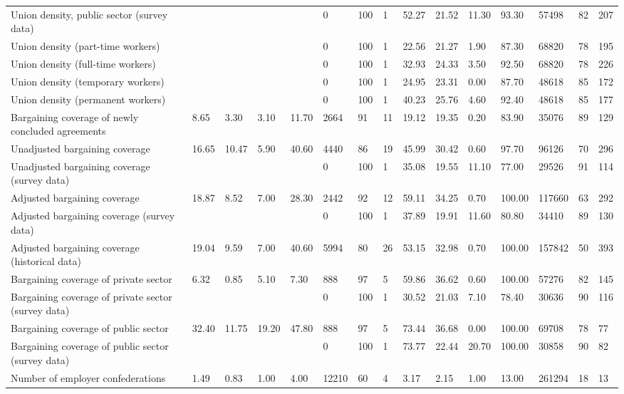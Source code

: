 \begin{longtable}{lllllllllllllll}
Union density, public sector (survey data) &  &  &  &  & 0 & 100 & 1 & 52.27 & 21.52 & 11.30 & 93.30 & 57498 & 82 & 207\\
Union density (part-time workers) &  &  &  &  & 0 & 100 & 1 & 22.56 & 21.27 & 1.90 & 87.30 & 68820 & 78 & 195\\
Union density (full-time workers) &  &  &  &  & 0 & 100 & 1 & 32.93 & 24.33 & 3.50 & 92.50 & 68820 & 78 & 226\\
Union density (temporary workers) &  &  &  &  & 0 & 100 & 1 & 24.95 & 23.31 & 0.00 & 87.70 & 48618 & 85 & 172\\
\addlinespace
Union density (permanent workers) &  &  &  &  & 0 & 100 & 1 & 40.23 & 25.76 & 4.60 & 92.40 & 48618 & 85 & 177\\
Bargaining coverage of newly concluded agreements & 8.65 & 3.30 & 3.10 & 11.70 & 2664 & 91 & 11 & 19.12 & 19.35 & 0.20 & 83.90 & 35076 & 89 & 129\\
Unadjusted bargaining coverage & 16.65 & 10.47 & 5.90 & 40.60 & 4440 & 86 & 19 & 45.99 & 30.42 & 0.60 & 97.70 & 96126 & 70 & 296\\
Unadjusted bargaining coverage (survey data) &  &  &  &  & 0 & 100 & 1 & 35.08 & 19.55 & 11.10 & 77.00 & 29526 & 91 & 114\\
Adjusted bargaining coverage & 18.87 & 8.52 & 7.00 & 28.30 & 2442 & 92 & 12 & 59.11 & 34.25 & 0.70 & 100.00 & 117660 & 63 & 292\\
\addlinespace
Adjusted bargaining coverage (survey data) &  &  &  &  & 0 & 100 & 1 & 37.89 & 19.91 & 11.60 & 80.80 & 34410 & 89 & 130\\
Adjusted bargaining coverage (historical data) & 19.04 & 9.59 & 7.00 & 40.60 & 5994 & 80 & 26 & 53.15 & 32.98 & 0.70 & 100.00 & 157842 & 50 & 393\\
Bargaining coverage of private sector & 6.32 & 0.85 & 5.10 & 7.30 & 888 & 97 & 5 & 59.86 & 36.62 & 0.60 & 100.00 & 57276 & 82 & 145\\
Bargaining coverage of private sector (survey data) &  &  &  &  & 0 & 100 & 1 & 30.52 & 21.03 & 7.10 & 78.40 & 30636 & 90 & 116\\
Bargaining coverage of public sector & 32.40 & 11.75 & 19.20 & 47.80 & 888 & 97 & 5 & 73.44 & 36.68 & 0.00 & 100.00 & 69708 & 78 & 77\\
\addlinespace
Bargaining coverage of public sector (survey data) &  &  &  &  & 0 & 100 & 1 & 73.77 & 22.44 & 20.70 & 100.00 & 30858 & 90 & 82\\
Number of employer confederations & 1.49 & 0.83 & 1.00 & 4.00 & 12210 & 60 & 4 & 3.17 & 2.15 & 1.00 & 13.00 & 261294 & 18 & 13\\

\end{longtable}
